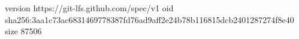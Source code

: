 version https://git-lfs.github.com/spec/v1
oid sha256:3aa1c73ac6831469778387fd76ad9aff2e24b78b116815dcb2401287274f8e40
size 87506
